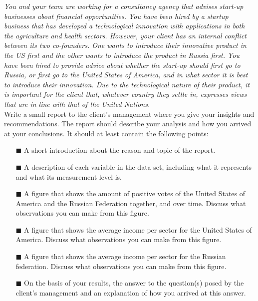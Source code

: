 \textit{You and your team are working for a consultancy agency that advises start-up businesses about financial opportunities. You have been hired by a startup business that has developed a technological innovation with applications in both the agriculture and health sectors. However, your client has an internal conflict between its two co-founders. One wants to introduce their innovative product in the US first and the other wants to introduce the product in Russia first. You have been hired to provide advice about whether the start-up should first go to Russia, or first go to the United States of America, and in what sector it is best to introduce their innovation. Due to the technological nature of their product, it is important for the client that, whatever country they settle in, expresses views that are in line with that of the United Nations.} \\

Write a small report to the client's management where you give your insights and recommendations. The report should describe your analysis and how you arrived at your conclusions. It should at least contain the following points: \\

\begin{itemize}
    \item[$\blacksquare$] A short introduction about the reason and topic of the report.
    \item[$\blacksquare$] A description of each variable in the  data set, including what it represents and what its measurement level is. 
    \item[$\blacksquare$] A figure that shows the amount of positive votes of the United States of America and the Russian Federation together, and over time.  Discuss what observations you can make from this figure.
    \item[$\blacksquare$] A figure that shows the average income per sector for the United States of America. Discuss what observations you can make from this figure.
    \item[$\blacksquare$] A figure that shows the average income per sector for the Russian federation. Discuss what observations you can make from this figure.
    \item[$\blacksquare$] On the basis of your results, the answer to the question(s) posed by the client's management and an explanation of how you arrived at this answer.
\end{itemize}

\clearpage %